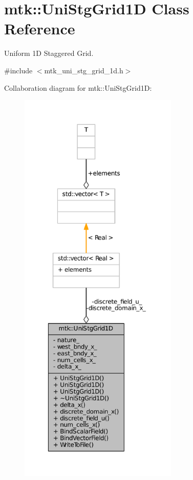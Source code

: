 \hypertarget{classmtk_1_1UniStgGrid1D}{\section{mtk\-:\-:Uni\-Stg\-Grid1\-D Class Reference}
\label{classmtk_1_1UniStgGrid1D}
}


Uniform 1\-D Staggered Grid.  




{\ttfamily \#include $<$mtk\-\_\-uni\-\_\-stg\-\_\-grid\-\_\-1d.\-h$>$}



Collaboration diagram for mtk\-:\-:Uni\-Stg\-Grid1\-D\-:\nopagebreak
\begin{figure}[H]
\begin{center}
\leavevmode
\includegraphics[height=550pt]{classmtk_1_1UniStgGrid1D__coll__graph}
\end{center}
\end{figure}
